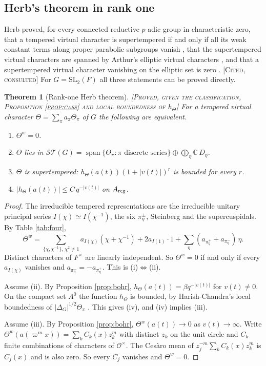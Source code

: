 \documentclass[12pt,letterpaper]{amsart}
\numberwithin{equation}{section}
\newtheorem{theorem}{Theorem}[section]
\theoremstyle{definition}
\theoremstyle{remark}
\newcommand{\ST}{\mathcal{ST}}
\newcommand{\status}[1]{\textup{[\textsc{#1}]}}
\begin{document}
\subsection{Herb's theorem in rank one}\label{sub:herb}
Herb proved, for every connected reductive $p$-adic group in characteristic zero, that a tempered virtual character is supertempered if and only if all its weak constant terms along proper parabolic subgroups vanish \cite[Theorem 2.5]{He94}, that the supertempered virtual characters are spanned by Arthur's elliptic virtual characters \cite[Theorem 3.1]{He94}, and that a supertempered virtual character vanishing on the elliptic set is zero \cite[Theorem 3.2]{He94}. \status{Cited, consulted} For $G=\mathrm{SL}_2(F)$ all three statements can be proved directly.

\begin{theorem}[Rank-one Herb theorem]\label{thm:herb}\status{Proved, given the classification, Proposition \ref{prop:cass} and local boundedness of $h_\Theta$}
For a tempered virtual character $\Theta=\sum_\pi a_\pi\Theta_\pi$ of $G$ the following are equivalent.
\begin{enumerate}[label=(\roman*),leftmargin=*]
\item $\Theta^w=0$.
\item $\Theta$ lies in $\ST(G)=\operatorname{span}\{\Theta_\pi:\pi\text{ discrete series}\}\oplus\bigoplus_{\eta}\mathbb C\,D_\eta$.
\item $\Theta$ is supertempered: $h_\Theta(a(t))(1+|v(t)|)^r$ is bounded for every $r$.
\item $|h_\Theta(a(t))|\le C\,q^{-|v(t)|}$ on $A_{\rm reg}$.
\end{enumerate}
\end{theorem}
\begin{proof}
The irreducible tempered representations are the irreducible unitary principal series $I(\chi)\simeq I(\chi^{-1})$, the six $\pi_\eta^\pm$, Steinberg and the supercuspidals. By Table \ref{tab:four},
\[
\Theta^w=\sum_{\{\chi,\chi^{-1}\},\,\chi^2\ne1}a_{I(\chi)}(\chi+\chi^{-1})+2a_{I(1)}\cdot1+\sum_\eta(a_{\pi_\eta^+}+a_{\pi_\eta^-})\,\eta .
\]
Distinct characters of $F^\times$ are linearly independent. So $\Theta^w=0$ if and only if every $a_{I(\chi)}$ vanishes and $a_{\pi_\eta^-}=-a_{\pi_\eta^+}$. This is (i)$\Leftrightarrow$(ii).

Assume (ii). By Proposition \ref{prop:bohr}, $h_\Theta(a(t))=\beta q^{-|v(t)|}$ for $v(t)\ne0$. On the compact set $A^0$ the function $h_\Theta$ is bounded, by Harish-Chandra's local boundedness of $|\Delta_G|^{1/2}\Theta_\pi$ \cite{HC99}. This gives (iv), and (iv) implies (iii).

Assume (iii). By Proposition \ref{prop:bohr}, $\Theta^w(a(t))\to0$ as $v(t)\to\infty$. Write $\Theta^w(a(\varpi^mx))=\sum_kC_k(x)z_k^m$ with distinct $z_k$ on the unit circle and $C_k$ finite combinations of characters of $\mathcal O^\times$. The Ces\`aro mean of $z_j^{-m}\sum_kC_k(x)z_k^m$ is $C_j(x)$ and is also zero. So every $C_j$ vanishes and $\Theta^w=0$.
\end{proof}
\end{document}
